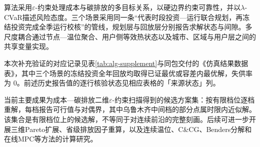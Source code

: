 算法采用$\varepsilon$-约束处理成本与碳排放的多目标关系，以硬边界约束可靠性，并以$\lambda$-CVaR描述风险态度。三个场景采用同一条“代表时段投资---运行联合规划，再冻结投资完成全季运行校核”的管线，规划层与回放层分别报告求解状态与间隙。多尺度耦合通过节点---温位聚合、用户侧等效热状态以及城市、区域与用户层之间的共享变量实现。

本次补充验证的对应记录见表\ref{tab:alg-supplement}与同包交付的《仿真结果数据表》，其中三个场景的冻结投资全年回放均取得已证最优或容差内最优解，失供率为 0。前述历史报告值的逐行核验状态见相应表格的「来源状态」列。

当前主要成果为成本---碳排放二维$\varepsilon$-约束扫描得到的候选方案集：按有限档位逐档重解，每档报告可行值与对偶界，其中乌鲁木齐中间档的部分点属时限内近似解。该集合是有限档位上的候选解，不等同于对连续前沿的完整刻画。后续可进一步开展三维Pareto扩展、省级排放因子重算，以及连续温位、C\&CG、Benders分解和在线MPC等方法的计算研究。
